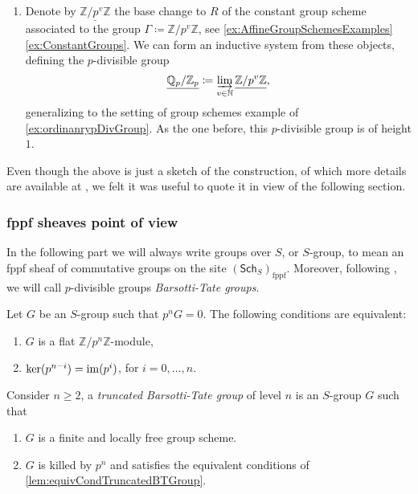 \begin{ex}
\begin{enumerate}
\item Denote by $\underline{\mathbb{Z}/p^v\mathbb{Z}}$ the base change to $R$\label{ex:Qp/Zp}
	of the constant group scheme associated
	to the group $\Gamma \coloneqq \mathbb{Z}/p^v\mathbb{Z}$, see \cref{ex:AffineGroupSchemesExamples}
	\cref{ex:ConstantGroups}.
	We can form an inductive system from these objects, defining the $p$-divisible group
	\begin{equation*}
	\underline{\mathbb{Q}_p/\mathbb{Z}_{p}} \coloneqq \varinjlim_{v \in \mathbb{N}}
	\underline{\mathbb{Z}/p^v\mathbb{Z}}
	,\end{equation*}
	generalizing to the setting of group schemes example of \cref{ex:ordinanrypDivGroup}.
	As the one before, this $p$-divisible group is of height $1$.
\end{enumerate}
\end{ex}


\begin{rem}[]
	Even though the above is just a sketch of the construction, of which more details
	are available at \cite[\S6]{Shatz},
	we felt it was useful to quote it in view of the following section.
\end{rem}



\subsubsection{fppf sheaves point of view}
In the following part we will always write groups over $S$, or $S$-group, to mean
an fppf sheaf of commutative groups on the site $(\mathsf{Sch}_{ S })_{\mathrm{fppf}}$.
Moreover, following \cite{Messing}, we will call $p$-divisible groups
{\em Barsotti-Tate groups}.


\begin{lem}\label{lem:equivCondTruncatedBTGroup}
	Let $G$ be an $S$-group such that $p^nG = 0$.
	The following conditions are equivalent:
\begin{enumerate}
	\item $G$ is a flat $\mathbb{Z}/p^n\mathbb{Z}$-module,

	\item $\ker(p^{n-i}) = \operatorname{im} (p^i)$, for $i=0, \ldots, n$.
\end{enumerate}
\end{lem} 


\begin{defn}
	Consider $n \geq 2$, a {\em truncated Barsotti-Tate group} of level $n$
	is an $S$-group $G$ such that
\begin{enumerate}
	\item $G$ is a finite and locally free group scheme.
	\item $G$ is killed by $p^n$ and satisfies the equivalent conditions of 
		\cref{lem:equivCondTruncatedBTGroup}.
\end{enumerate}
\end{defn}


